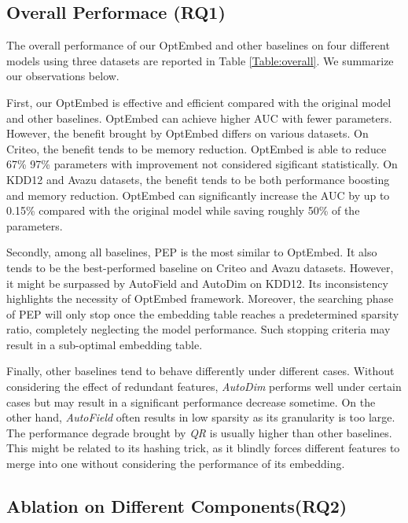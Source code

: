 \documentclass[sigconf]{acmart}
\begin{document}
\subsection{Overall Performace (RQ1)}

The overall performance of our OptEmbed and other baselines on four different models using three datasets are reported in Table \ref{Table:overall}. We summarize our observations below.

First, our OptEmbed is effective and efficient compared with the original model and other baselines. OptEmbed can achieve higher AUC with fewer parameters. However, the benefit brought by OptEmbed differs on various datasets. On Criteo, the benefit tends to be memory reduction. OptEmbed is able to reduce 67\%  97\% parameters with improvement not considered sigificant statistically. On KDD12 and Avazu datasets, the benefit tends to be both performance boosting and memory reduction. OptEmbed can significantly increase the AUC by up to 0.15\% compared with the original model while saving roughly 50\% of the parameters.

Secondly, among all baselines, PEP is the most similar to OptEmbed. It also tends to be the best-performed baseline on Criteo and Avazu datasets. However, it might be surpassed by AutoField and AutoDim on KDD12. Its inconsistency highlights the necessity of OptEmbed framework. Moreover, the searching phase of PEP will only stop once the embedding table reaches a predetermined sparsity ratio, completely neglecting the model performance. Such stopping criteria may result in a sub-optimal embedding table.


Finally, other baselines tend to behave differently under different cases. Without considering the effect of redundant features, \textit{AutoDim} performs well under certain cases but may result in a significant performance decrease sometime. On the other hand, \textit{AutoField} often results in low sparsity as its granularity is too large. The performance degrade brought by \textit{QR} is usually higher than other baselines. This might be related to its hashing trick, as it blindly forces different features to merge into one without considering the performance of its embedding. 








 

\subsection{Ablation on Different Components(RQ2)}
\end{document}
